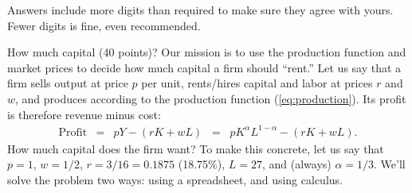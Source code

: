 \documentclass[12pt]{exam}
\begin{document}
\begin{questions}

\begin{solution}
Answers include more digits than required to make sure they agree with yours.
Fewer digits is fine, even recommended.
\end{solution}

\question How much capital (40 points)?
Our mission is to use the production function
and market prices
to decide how much capital a firm should ``rent.''
Let us say that a firm sells output at price $p$ per unit,
rents/hires capital and labor at prices $r$ and $w$,
and produces according to the production function (\ref{eq:production}).
Its profit is therefore revenue minus cost:
\begin{eqnarray*}
    \mbox{Profit} &=& p Y - (rK + wL)
            \;\;=\;\; p K^\alpha L^{1-\alpha} - (rK + wL) .
\end{eqnarray*}
How much capital does the firm want?
To make this concrete, let us say that
$ p = 1$, $w = 1/2$, $r = 3/16 = 0.1875 $ (18.75\%), $L=27$,
and (always) $\alpha = 1/3$.
We'll solve the problem two ways:
using a spreadsheet, and using calculus.


\end{questions}
\end{document}
